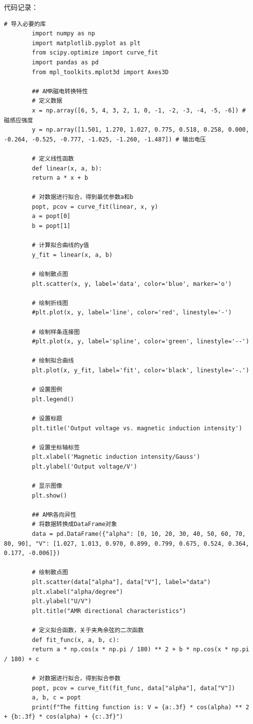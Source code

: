 \documentclass[dvipsnames, svgnames,a4paper,11pt]{article}
\begin{document}
	\clearpage
	代码记录：
	\begin{lstlisting}[style=pythonstyle,caption=代码记录1]
		# 导入必要的库
		import numpy as np
		import matplotlib.pyplot as plt
		from scipy.optimize import curve_fit
		import pandas as pd
		from mpl_toolkits.mplot3d import Axes3D
		
		## AMR磁电转换特性
		# 定义数据
		x = np.array([6, 5, 4, 3, 2, 1, 0, -1, -2, -3, -4, -5, -6]) # 磁感应强度
		y = np.array([1.501, 1.270, 1.027, 0.775, 0.518, 0.258, 0.000, -0.264, -0.525, -0.777, -1.025, -1.260, -1.487]) # 输出电压
		
		# 定义线性函数
		def linear(x, a, b):
		return a * x + b
		
		# 对数据进行拟合，得到最优参数a和b
		popt, pcov = curve_fit(linear, x, y)
		a = popt[0]
		b = popt[1]
		
		# 计算拟合曲线的y值
		y_fit = linear(x, a, b)
		
		# 绘制散点图
		plt.scatter(x, y, label='data', color='blue', marker='o')
		
		# 绘制折线图
		#plt.plot(x, y, label='line', color='red', linestyle='-')
		
		# 绘制样条连接图
		#plt.plot(x, y, label='spline', color='green', linestyle='--')
		
		# 绘制拟合曲线
		plt.plot(x, y_fit, label='fit', color='black', linestyle='-.')
		
		# 设置图例
		plt.legend()
		
		# 设置标题
		plt.title('Output voltage vs. magnetic induction intensity')
		
		# 设置坐标轴标签
		plt.xlabel('Magnetic induction intensity/Gauss')
		plt.ylabel('Output voltage/V')
		
		# 显示图像
		plt.show()
		
		## AMR各向异性
		# 将数据转换成DataFrame对象
		data = pd.DataFrame({"alpha": [0, 10, 20, 30, 40, 50, 60, 70, 80, 90], "V": [1.027, 1.013, 0.970, 0.899, 0.799, 0.675, 0.524, 0.364, 0.177, -0.006]})
		
		# 绘制散点图
		plt.scatter(data["alpha"], data["V"], label="data")
		plt.xlabel("alpha/degree")
		plt.ylabel("U/V")
		plt.title("AMR directional characteristics")
		
		# 定义拟合函数，关于夹角余弦的二次函数
		def fit_func(x, a, b, c):
		return a * np.cos(x * np.pi / 180) ** 2 + b * np.cos(x * np.pi / 180) + c
		
		# 对数据进行拟合，得到拟合参数
		popt, pcov = curve_fit(fit_func, data["alpha"], data["V"])
		a, b, c = popt
		print(f"The fitting function is: V = {a:.3f} * cos(alpha) ** 2 + {b:.3f} * cos(alpha) + {c:.3f}")
		

\end{lstlisting}
\end{document}
